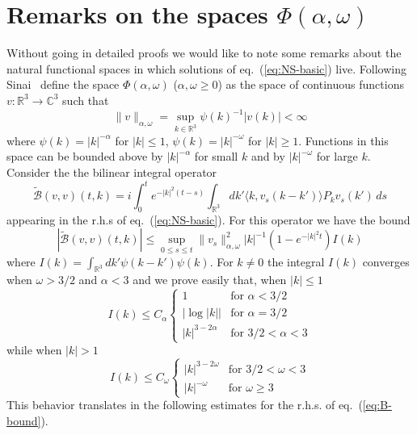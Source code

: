 \documentclass[a4paper,12pt,reqno]{amsart}
\newcommand{\1}{{\bf 1}}
\newcommand{\RR}{\mathbb{R}}
\newcommand{\CC}{\mathbb{C}}
\begin{document}
\appendix
\section{Remarks on the spaces $\Phi(\alpha,\omega)$}
\label{sec:remarks2}
Without going in detailed proofs we would like to note some remarks
about the natural functional spaces in which solutions of
eq.~(\ref{eq:NS-basic})  live. Following Sinai~\cite{Sinai1} define the
space $\Phi(\alpha,\omega)$ ($\alpha,\omega \ge 0$) as the space of continuous functions $v :
\RR^3 \to \CC^3$ such that 
$$
\|v\|_{\alpha,\omega} = \sup_{k \in \RR^3} \psi(k)^{-1} |v(k)| <\infty
$$
where  $\psi(k) = |k|^{-\alpha}$ for $|k| \le 1$, $\psi(k) =
|k|^{-\omega}$ for $|k| \ge 1$.
Functions in this space can be bounded above by $|k|^{-\alpha}$ for
small $k$ and by $|k|^{-\omega}$ for large $k$. 
Consider the the bilinear integral operator
\begin{equation}
  \label{eq:bilin}
\widetilde{\mathcal{B}}(v,v)(t,k) = i \int_0^t e^{-|k|^2 (t-s)}  
 \int_{\RR^3}dk' \langle k, v_s(k-k')\rangle P_k v_s(k')\, ds 
\end{equation}
appearing in the r.h.s of eq.~(\ref{eq:NS-basic}). For this operator
we have the bound
\begin{equation}
  \label{eq:B-bound}
|\widetilde{\mathcal{B}}(v,v)(t,k)| \le \sup_{0 \le s \le t}
\|v_s\|_{\alpha,\omega}^2 |k|^{-1} (1-e^{-|k|^2 t}) I(k)  
\end{equation}
where
$
I(k) = \int_{\RR^3} dk' \psi(k-k') \psi(k)
$.
 For $k \neq 0$ the integral $I(k)$ converges when $\omega > 3/2$ and $\alpha < 3$ and we prove easily that, when $|k|
\le 1$
\begin{equation*}
I(k) \le C_\alpha \begin{cases}
1 & \text{for $\alpha < 3/2$}\\
|\log|k|| & \text{for $\alpha = 3/2$} \\
|k|^{3-2\alpha} & \text{for $3/2 < \alpha < 3$}
\end{cases}  
\end{equation*}
while when $|k|> 1$
\begin{equation*}
I(k) \le C_\omega \begin{cases}
|k|^{3-2\omega} & \text{for $3/2 <\omega < 3$}\\
|k|^{-\omega} & \text{for $\omega \ge 3$}
\end{cases}  
\end{equation*}
This behavior translates in the following estimates for the r.h.s. of eq.~(\ref{eq:B-bound}).
\end{document}
